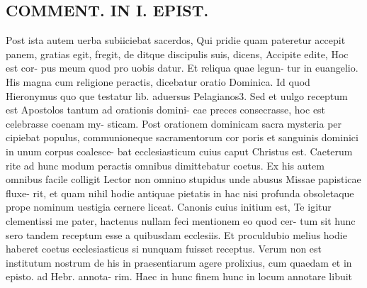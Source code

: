 \documentclass{article}
\begin{document}
\begin{pages}
\section*{COMMENT. IN I. EPIST. }\pstart Post ista autem uerba subiiciebat sacerdos, Qui pridie quam pateretur accepit panem, gratias egit, fregit, de ditque discipulis suis, dicens, Accipite edite, Hoc est cor- pus meum quod pro uobis datur. Et reliqua quae legun- tur in euangelio. His magna cum religione peractis, dicebatur oratio Dominica. Id quod Hieronymus quo que testatur lib. aduersus Pelagianos3. Sed et uulgo receptum est Apostolos tantum ad orationis domini- cae preces consecrasse, hoc est celebrasse coenam my- sticam. Post orationem dominicam sacra mysteria per cipiebat populus, communioneque sacramentorum cor poris et sanguinis dominici in unum corpus coalesce- bat ecclesiasticum cuius caput Christus est. Caeterum rite ad hunc modum peractis omnibus dimittebatur coetus. Ex his autem omnibus facile colligit Lector non omnino stupidus unde abusus Missae papisticae fluxe- rit, et quam nihil hodie antiquae pietatis in hac nisi profunda obsoletaque prope nominum uestigia cernere liceat. Canonis cuius initium est, Te igitur clementissi me pater, hactenus nullam feci mentionem eo quod cer- tum sit hunc sero tandem receptum esse a quibusdam ecclesiis. Et proculdubio melius hodie haberet coetus ecclesiasticus si nunquam fuisset receptus. Verum non est institutum nostrum de his in praesentiarum agere prolixius, cum quaedam et in episto. ad Hebr. annota- rim. Haec in hunc finem hunc in locum annotare libuit  \pend

\end{pages}
\end{document}
